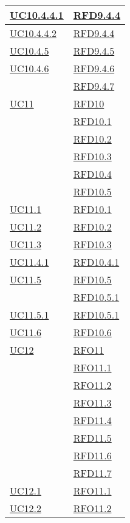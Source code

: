 \begin{longtable}{|>{\centering}m{5cm}|m{5cm}<{\centering}|}
\hyperref[UC10.4.4.1]{UC10.4.4.1} & \hyperlink{RFD9.4.4}{RFD9.4.4}\\ \hline
\hyperref[UC10.4.4.2]{UC10.4.4.2} & \hyperlink{RFD9.4.4}{RFD9.4.4}\\ \hline
\hyperref[UC10.4.5]{UC10.4.5} & \hyperlink{RFD9.4.5}{RFD9.4.5}\\ \hline
\hyperref[UC10.4.6]{UC10.4.6} & \hyperlink{RFD9.4.6}{RFD9.4.6}\\
& \hyperlink{RFD9.4.7}{RFD9.4.7}\\ \hline
\hyperref[UC11]{UC11} & \hyperlink{RFD10}{RFD10}\\
& \hyperlink{RFD10.1}{RFD10.1}\\
& \hyperlink{RFD10.2}{RFD10.2}\\
& \hyperlink{RFD10.3}{RFD10.3}\\
& \hyperlink{RFD10.4}{RFD10.4}\\
& \hyperlink{RFD10.5}{RFD10.5}\\ \hline
\hyperref[UC11.1]{UC11.1} & \hyperlink{RFD10.1}{RFD10.1}\\ \hline
\hyperref[UC11.2]{UC11.2} & \hyperlink{RFD10.2}{RFD10.2}\\ \hline
\hyperref[UC11.3]{UC11.3} & \hyperlink{RFD10.3}{RFD10.3}\\ \hline
\hyperref[UC11.4.1]{UC11.4.1} & \hyperlink{RFD10.4.1}{RFD10.4.1}\\ \hline
\hyperref[UC11.5]{UC11.5} & \hyperlink{RFD10.5}{RFD10.5}\\
& \hyperlink{RFD10.5.1}{RFD10.5.1}\\ \hline
\hyperref[UC11.5.1]{UC11.5.1} & \hyperlink{RFD10.5.1}{RFD10.5.1}\\ \hline
\hyperref[UC11.6]{UC11.6} & \hyperlink{RFD10.6}{RFD10.6}\\ \hline
\hyperref[UC12]{UC12} & \hyperlink{RFO11}{RFO11}\\
& \hyperlink{RFO11.1}{RFO11.1}\\
& \hyperlink{RFO11.2}{RFO11.2}\\
& \hyperlink{RFO11.3}{RFO11.3}\\
& \hyperlink{RFD11.4}{RFD11.4}\\
& \hyperlink{RFD11.5}{RFD11.5}\\
& \hyperlink{RFD11.6}{RFD11.6}\\
& \hyperlink{RFD11.7}{RFD11.7}\\ \hline
\hyperref[UC12.1]{UC12.1} & \hyperlink{RFO11.1}{RFO11.1}\\ \hline
\hyperref[UC12.2]{UC12.2} & \hyperlink{RFO11.2}{RFO11.2}\\ \hline

\end{longtable}
